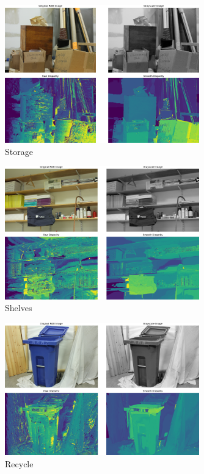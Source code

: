 \documentclass{article}
\begin{document}
\begin{figure}[h]
    \centering
    \includegraphics[width=0.75\textwidth]{storage.png} %
    \caption*{Storage} %
\end{figure}
\vspace{3cm}
\begin{figure}[h]
    \centering
    \includegraphics[width=0.75\textwidth]{shelves.png} %
    \caption*{Shelves} %
\end{figure}

\begin{figure}[h]
    \centering
    \includegraphics[width=0.75\textwidth]{recycle.png} %
    \caption*{Recycle} %
\end{figure}
\end{document}
